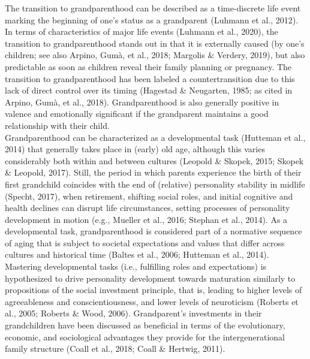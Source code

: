 \documentclass[
  english,
  man,floatsintext]{apa7}
\begin{document}
The transition to grandparenthood can be described as a time-discrete life event marking the beginning of one's status as a grandparent (Luhmann et al., 2012). In terms of characteristics of major life events (Luhmann et al., 2020), the transition to grandparenthood stands out in that it is externally caused (by one's children; see also Arpino, Gumà, et al., 2018; Margolis \& Verdery, 2019), but also predictable as soon as children reveal their family planning or pregnancy. The transition to grandparenthood has been labeled a countertransition due to this lack of direct control over its timing (Hagestad \& Neugarten, 1985; as cited in Arpino, Gumà, et al., 2018). Grandparenthood is also generally positive in valence and emotionally significant if the grandparent maintains a good relationship with their child.\\
Grandparenthood can be characterized as a developmental task (Hutteman et al., 2014) that generally takes place in (early) old age, although this varies considerably both within and between cultures (Leopold \& Skopek, 2015; Skopek \& Leopold, 2017). Still, the period in which parents experience the birth of their first grandchild coincides with the end of (relative) personality stability in midlife (Specht, 2017), when retirement, shifting social roles, and initial cognitive and health declines can disrupt life circumstances, setting processes of personality development in motion (e.g., Mueller et al., 2016; Stephan et al., 2014). As a developmental task, grandparenthood is considered part of a normative sequence of aging that is subject to societal expectations and values that differ across cultures and historical time (Baltes et al., 2006; Hutteman et al., 2014). Mastering developmental tasks (i.e., fulfilling roles and expectations) is hypothesized to drive personality development towards maturation similarly to propositions of the social investment principle, that is, leading to higher levels of agreeableness and conscientiousness, and lower levels of neuroticism (Roberts et al., 2005; Roberts \& Wood, 2006). Grandparent's investments in their grandchildren have been discussed as beneficial in terms of the evolutionary, economic, and sociological advantages they provide for the intergenerational family structure (Coall et al., 2018; Coall \& Hertwig, 2011).\\
\end{document}
